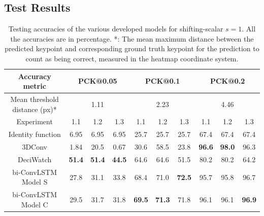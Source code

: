 \documentclass[./main.tex]{subfiles}
\begin{document}
\subsection{Test Results}
\label{subsec:pretrain_test_res}
\begin{table}[htbp]
    \begin{tabular}{c||ccc|ccc|ccc}
        \hline
        Accuracy metric & \multicolumn{3}{c}{PCK@0.05} & \multicolumn{3}{c}{PCK@0.1} & \multicolumn{3}{c}{PCK@0.2} \\
        \hline
        Mean threshold distance (px)* & \multicolumn{3}{c}{1.11} & \multicolumn{3}{c}{2.23} & \multicolumn{3}{c}{4.46} \\
        \hline
        Experiment & 1.1 & 1.2 & 1.3 & 1.1 & 1.2 & 1.3 & 1.1 & 1.2 & 1.3 \\
        \hline
        \hline
        Identity function & 6.95 & 6.95 & 6.95 & 25.7 & 25.7 & 25.7 & 67.4 & 67.4 & 67.4 \\
        3DConv & 1.84 & 20.5 & 0.67 & 30.6 & 58.5 & 23.8 & \textbf{96.6} & \textbf{98.0} & 96.3 \\
        DeciWatch & \textbf{51.4} & \textbf{51.4} & \textbf{44.5} & 64.6 & 64.6 & 51.5 & 80.2 & 80.2 & 64.2 \\
        bi-ConvLSTM Model S & 27.8 & 31.1 & 33.8 & 68.4 & 71.0 & \textbf{72.5} & 95.7 & 95.8 & 96.7\\
        bi-ConvLSTM Model C & 29.5 & 31.7 & 31.8 & \textbf{69.5} & \textbf{71.3} & 71.8 & 96.1 & 96.1 & \textbf{96.9} \\
        \hline
    \end{tabular}
    \caption{Testing accuracies of the various developed models for shifting-scalar $s = 1$. All the accuracies are in percentage. *: The mean maximum distance between the predicted keypoint and corresponding ground truth keypoint for the prediction to count as being correct, measured in the heatmap coordinate system.}
    \label{tab:pretrain_test_accs_1}
\end{table}
\end{document}
